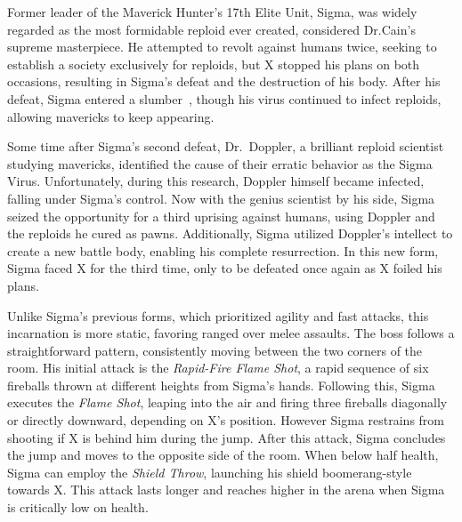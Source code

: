 Former leader of the Maverick Hunter's 17th Elite Unit, Sigma, was widely regarded as the most formidable reploid ever created, considered Dr.Cain's supreme masterpiece. He attempted to revolt against humans twice, seeking to establish a society exclusively for reploids, but X stopped his plans on both occasions, resulting in Sigma's defeat and the destruction of his body. After his defeat, Sigma entered a slumber~\cite{wayback:X3_resources}, though his virus continued to infect reploids, allowing mavericks to keep appearing.

Some time after Sigma's second defeat, Dr.~Doppler, a brilliant reploid scientist studying mavericks, identified the cause of their erratic behavior as the Sigma Virus. Unfortunately, during this research, Doppler himself became infected, falling under Sigma's control. Now with the genius scientist by his side, Sigma seized the opportunity for a third uprising against humans, using Doppler and the reploids he cured as pawns. Additionally, Sigma utilized Doppler's intellect to create a new battle body, enabling his complete resurrection. In this new form, Sigma faced X for the third time, only to be defeated once again as X foiled his plans.

Unlike Sigma's previous forms, which prioritized agility and fast attacks, this incarnation is more static, favoring ranged over melee assaults. The boss follows a straightforward pattern, consistently moving between the two corners of the room. His initial attack is the \emph{Rapid-Fire Flame Shot}, a rapid sequence of six fireballs thrown at different heights from Sigma's hands. Following this, Sigma executes the \emph{Flame Shot}, leaping into the air and firing three fireballs diagonally or directly downward, depending on X's position. However Sigma restrains from shooting if X is behind him during the jump. After this attack, Sigma concludes the jump and moves to the opposite side of the room. When below half health, Sigma can employ the \emph{Shield Throw}, launching his shield boomerang-style towards X. This attack lasts longer and reaches higher in the arena when Sigma is critically low on health.

